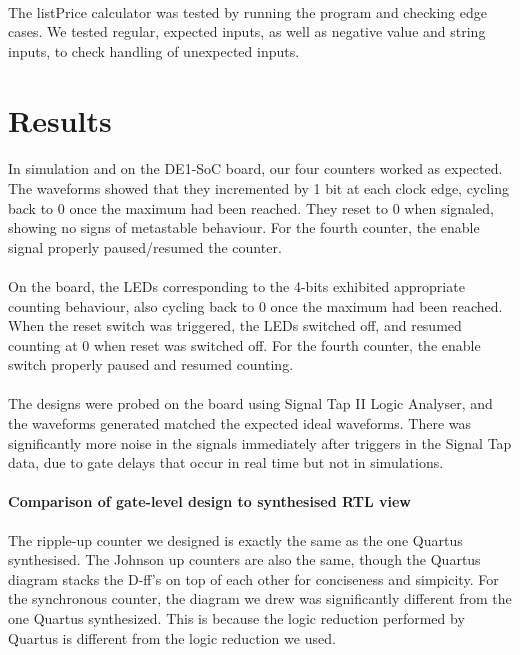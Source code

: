 \documentclass{article}
\begin{document}
	  	\paragraph{} The listPrice calculator was tested by running the program and checking edge cases. We tested regular, expected inputs, as well as negative value and string inputs, to check handling of unexpected inputs.



\section{Results}

  \paragraph{} In simulation and on the DE1-SoC board, our four counters worked as expected. The waveforms showed that they incremented by 1 bit at each clock edge, cycling back to 0 once the maximum had been reached. They reset to 0 when signaled, showing no signs of metastable behaviour. For the fourth counter, the enable signal properly paused/resumed the counter.

  \paragraph{} On the board, the LEDs corresponding to the 4-bits exhibited appropriate counting behaviour, also cycling back to 0 once the maximum had been reached. When the reset switch was triggered, the LEDs switched off, and resumed counting at 0 when reset was switched off. For the fourth counter, the enable switch properly paused and resumed counting.

  \paragraph{} The designs were probed on the board using Signal Tap II Logic Analyser, and the waveforms generated matched the expected ideal waveforms. There was significantly more noise in the signals immediately after triggers in the Signal Tap data, due to gate delays that occur in real time but not in simulations.

  \paragraph{Comparison of gate-level design to synthesised RTL view} The ripple-up counter we designed is exactly the same as the one Quartus synthesised. The Johnson up counters are also the same, though the Quartus diagram stacks the D-ff's on top of each other for conciseness and simpicity. For the synchronous counter, the diagram we drew was significantly different from the one Quartus synthesized. This is because the logic reduction performed by Quartus is different from the logic reduction we used.
\end{document}
